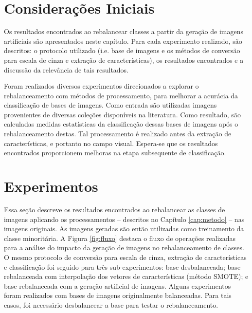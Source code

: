 

\section{Considerações Iniciais}

Os resultados encontrados ao rebalancear classes a partir da geração de imagens artificiais são apresentados neste capítulo. Para cada experimento realizado, são descritos: o protocolo utilizado (i.e. base de imagens e os métodos de conversão para escala de cinza e extração de características), os resultados encontrados e a discussão da relevância de tais resultados.

Foram realizados diversos experimentos direcionados a explorar o rebalanceamento com métodos de processamento, para melhorar a acurácia da classificação de bases de imagens. Como entrada são utilizadas imagens provenientes de diversas coleções disponíveis na literatura. Como resultado, são calculadas medidas estatísticas da classificação dessas bases de imagens após o rebalanceamento destas. Tal processamento é realizado antes da extração de características, e portanto no campo visual. Espera-se que os resultados encontrados proporcionem melhoras na etapa subsequente de classificação.


\section{Experimentos}

Essa seção descreve os resultados encontrados ao rebalancear as classes de imagens aplicando os processamentos -- descritos no Capítulo \ref{cap:metodo} -- nas imagens originais. As imagens geradas são então utilizadas como treinamento da classe minoritária. A Figura \ref{fig:fluxo} destaca o fluxo de operações realizadas para a análise do impacto da geração de imagens no rebalanceamento de classes. O mesmo protocolo de conversão para escala de cinza, extração de características e classificação foi seguido para três sub-experimentos: base desbalanceada; base rebalanceada com interpolação dos vetores de características (método SMOTE); e base rebalanceada com a geração artificial de imagens. Alguns experimentos foram realizados com bases de imagens originalmente balanceadas. Para tais casos, foi necessário desbalancear a base para testar o rebalanceamento.

